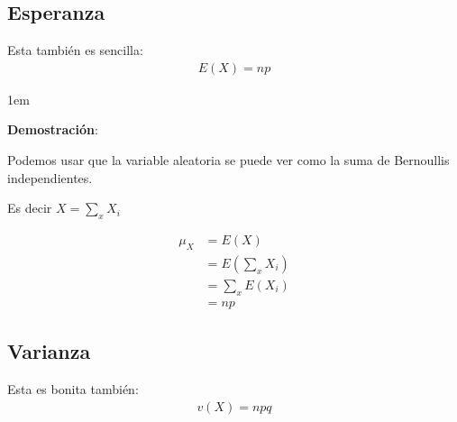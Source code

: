 \documentclass[12pt, fleqn]{report}                             %
\newenvironment{SmallIndentation}[1][0.75em]                    %
        {\begin{adjustwidth}{#1}{}\begin{footnotesize}}             %
        {\end{footnotesize}\end{adjustwidth}}                       %
\theoremstyle{break}                                            %
\begin{document}
            \vspace{1em}
            \subsection{Esperanza}  

                Esta también es sencilla:
                \begin{align*}
                    E(X) = np
                \end{align*}

                \begin{SmallIndentation}[1em]
                    \textbf{Demostración}:
                    
                    Podemos usar que la variable aleatoria se puede ver como la suma
                    de Bernoullis independientes.

                    Es decir $X = \sum_x X_i$

                    \begin{align*}
                        \mu_X 
                            &= E(X)                 \\
                            &= E(\sum_x X_i)        \\
                            &= \sum_x E(X_i)        \\
                            &= np
                    \end{align*}
                    
                \end{SmallIndentation}


            \clearpage
            \subsection{Varianza}

                Esta es bonita también:
                \begin{align*}
                    v(X) = npq   
                \end{align*}
\end{document}
